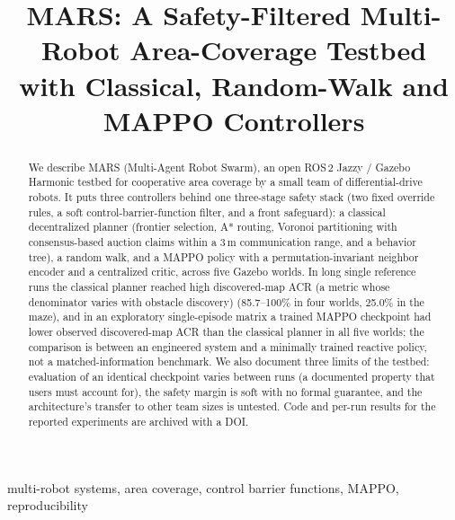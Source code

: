 \documentclass[conference]{IEEEtran}
\newcommand{\si}[1]{\mathrm{#1}}
\begin{document}
\title{MARS: A Safety-Filtered Multi-Robot Area-Coverage Testbed\\
with Classical, Random-Walk and MAPPO Controllers}

\author{
}

\maketitle

\begin{abstract}
We describe MARS (Multi-Agent Robot Swarm), an open ROS\,2 Jazzy / Gazebo Harmonic testbed for
cooperative area coverage by a small team of differential-drive robots. It puts
three controllers behind one three-stage safety stack (two fixed override
rules, a soft control-barrier-function filter, and a front safeguard): a
classical decentralized planner (frontier selection, A* routing, Voronoi
partitioning with consensus-based auction claims within a $3\,\si{m}$ communication
range, and a behavior tree), a random walk, and a MAPPO policy with a
permutation-invariant neighbor encoder and a centralized critic, across five
Gazebo worlds. In long single reference runs the classical planner reached
high discovered-map ACR (a metric whose denominator varies with obstacle discovery) (85.7--100\% in four worlds, 25.0\% in the maze),
and in an exploratory single-episode matrix a trained MAPPO checkpoint had
lower observed discovered-map ACR than the classical planner in all five worlds; the
comparison is between an engineered system and a minimally trained reactive
policy, not a matched-information benchmark. We also document three limits of the testbed: evaluation of an identical checkpoint
varies between runs (a documented property that users must account for),
the safety margin is soft with no formal guarantee, and the architecture's
transfer to other team sizes is untested. Code and per-run results for the reported
experiments are archived with a DOI.
\end{abstract}

\begin{IEEEkeywords}
multi-robot systems, area coverage, control barrier functions, MAPPO,
reproducibility
\end{IEEEkeywords}
\end{document}
